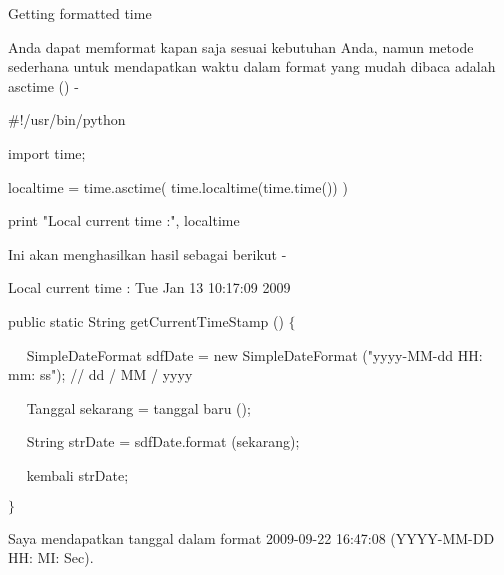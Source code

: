 \vspace{12pt}
\vspace{12pt}
\vspace{12pt}
\vspace{12pt}
\vspace{12pt}
\vspace{12pt}
\vspace{12pt}
\vspace{12pt}
\noindent 
Getting formatted time \par
\noindent 
 \hspace*{0.5in} Anda dapat memformat kapan saja sesuai kebutuhan Anda, namun metode sederhana untuk mendapatkan waktu dalam format yang mudah dibaca adalah asctime () - \par
\noindent 
 \hspace*{0.5in}  $  \#  $!/usr/bin/python \par
\noindent 
 \hspace*{0.5in} import time; \par
\vspace{12pt}
\noindent 
 \hspace*{0.5in} localtime = time.asctime( time.localtime(time.time()) ) \par
\noindent 
 \hspace*{0.5in} print "Local current time :", localtime \par
\vspace{12pt}
\noindent 
Ini akan menghasilkan hasil sebagai berikut - \par
\noindent 
 \hspace*{0.5in} Local current time : Tue Jan 13 10:17:09 2009 \par
\vspace{12pt}
\vspace{12pt}
\noindent 
public static String getCurrentTimeStamp ()  $  \{  $ \par
\noindent 
 $  $ $  $ $  $ $  $ SimpleDateFormat sdfDate = new SimpleDateFormat ("yyyy-MM-dd HH: mm: ss"); // dd / MM / yyyy \par
\noindent 
 $  $ $  $ $  $ $  $ Tanggal sekarang = tanggal baru (); \par
\noindent 
 $  $ $  $ $  $ $  $ String strDate = sdfDate.format (sekarang); \par
\noindent 
 $  $ $  $ $  $ $  $ kembali strDate; \par
\noindent 
 $  \}  $ \par
\noindent 
Saya mendapatkan tanggal dalam format 2009-09-22 16:47:08 (YYYY-MM-DD HH: MI: Sec). \par
